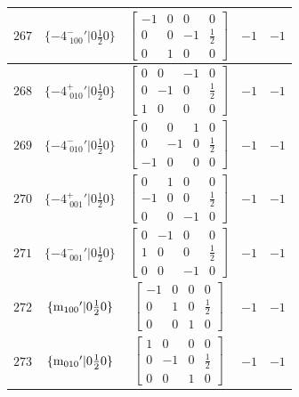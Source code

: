 \documentclass[fleqn,8pt]{jsarticle}
\begin{document}
\begin{longtable}{ccccc}
$ 267 $ & $ \{-4^{-}_{\,\,100}{}'|0 \frac{1}{2} 0\} $ & $ \begin{bmatrix} -1 & 0 & 0 & 0 \\ 0 & 0 & -1 & \frac{1}{2} \\ 0 & 1 & 0 & 0 \end{bmatrix} $ & $ -1 $ & $ -1 $ \\ \hline
$ 268 $ & $ \{-4^{+}_{\,\,010}{}'|0 \frac{1}{2} 0\} $ & $ \begin{bmatrix} 0 & 0 & -1 & 0 \\ 0 & -1 & 0 & \frac{1}{2} \\ 1 & 0 & 0 & 0 \end{bmatrix} $ & $ -1 $ & $ -1 $ \\ \hline
$ 269 $ & $ \{-4^{-}_{\,\,010}{}'|0 \frac{1}{2} 0\} $ & $ \begin{bmatrix} 0 & 0 & 1 & 0 \\ 0 & -1 & 0 & \frac{1}{2} \\ -1 & 0 & 0 & 0 \end{bmatrix} $ & $ -1 $ & $ -1 $ \\ \hline
$ 270 $ & $ \{-4^{+}_{\,\,001}{}'|0 \frac{1}{2} 0\} $ & $ \begin{bmatrix} 0 & 1 & 0 & 0 \\ -1 & 0 & 0 & \frac{1}{2} \\ 0 & 0 & -1 & 0 \end{bmatrix} $ & $ -1 $ & $ -1 $ \\ \hline
$ 271 $ & $ \{-4^{-}_{\,\,001}{}'|0 \frac{1}{2} 0\} $ & $ \begin{bmatrix} 0 & -1 & 0 & 0 \\ 1 & 0 & 0 & \frac{1}{2} \\ 0 & 0 & -1 & 0 \end{bmatrix} $ & $ -1 $ & $ -1 $ \\ \hline
$ 272 $ & $ \{{\rm m}_{100}{}'|0 \frac{1}{2} 0\} $ & $ \begin{bmatrix} -1 & 0 & 0 & 0 \\ 0 & 1 & 0 & \frac{1}{2} \\ 0 & 0 & 1 & 0 \end{bmatrix} $ & $ -1 $ & $ -1 $ \\ \hline
$ 273 $ & $ \{{\rm m}_{010}{}'|0 \frac{1}{2} 0\} $ & $ \begin{bmatrix} 1 & 0 & 0 & 0 \\ 0 & -1 & 0 & \frac{1}{2} \\ 0 & 0 & 1 & 0 \end{bmatrix} $ & $ -1 $ & $ -1 $ \\ \hline

\end{longtable}
\end{document}
